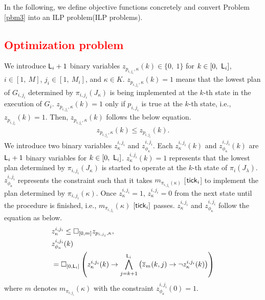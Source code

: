 \documentclass[journal,twoside,web]{IEEEtran}
\newcommand{\tick}{{\sf tick}}
\newcommand{\Len}{{\sf L}}
\newcommand{\G}[1]{\Box_{[#1]}}
\newcommand{\red}[1]{\textcolor{red}{#1}}
\begin{document}
In the following, we define objective functions concretely and convert Problem \ref{pbm3} into an ILP problem(ILP problems).
\red{
\subsection{Optimization problem}}
%
%
We introduce $\Len_i + 1$ binary variables $z_{p_{i,{j_i}},\kappa}(k)\in\{0,~1\}$ for $k\in[0,~\Len_i]$, $i\in[1,~M]$, $j_i\in[1,~M_i]$, and $\kappa\in K$.
$z_{p_{i,{j_i}},\kappa}(k)=1$ means that the lowest plan of $G_{i,{j_i}}$ determined by $\pi_{i,j_i}(J_\kappa)$ is being  implemented at the $k$-th state in the execution of $G_i$.
$z_{p_{i,{j_i}},\kappa}(k)=1$ only if $p_{i,{j_i}}$ is true at the $k$-th state, i.e., $z_{p_{i,{j_i}}}(k)=1$.
Then, $z_{p_{i,{j_i}},\kappa}(k)$ follows the below equation.
\begin{align}\label{hier1}
{z}_{p_{i,{j_i}},\kappa}(k) \leq z_{p_{i,{j_i}}}(k).
\end{align}
%
We introduce two binary variables ${z}^{i,j_i}_\kappa$ and $z^{i,j_i}_{\phi_\kappa}$.
Each ${z}^{i,{j_i}}_\kappa(k)$ and $z^{i,{j_i}}_{\phi_\kappa}(k)$ are $\Len_i + 1$ binary variables for $k\in[0,~\Len_i]$.
${z}^{i,j_i}_\kappa(k)=1$ represents that the lowest plan determined by $\pi_{i,j_i}(J_\kappa)$ is started to operate at the $k$-th state of $\pi_i(J_\lambda)$.
$z^{i,j_i}_{\phi_\kappa}$ represents the constraint such that it takes $m_{\pi_{i,{j_i}}(\kappa)}$ [$\tick_i$] to implement the plan determined by $\pi_{i,{j_i}}(\kappa)$.
Once ${z}^{i,j_i}_\kappa=1$, ${z}^{i,j_i}_\kappa=0$ from the next state until the procedure is finished, i.e., $m_{\pi_{i,j_i}}(\kappa)$ $[\tick_i]$ passes.
%
${z}^{i,j_i}_\kappa$ and $z^{i,j_i}_{\phi_\kappa}$ follow the equation as below.
%
\begin{align}
&{z}^{i,j_i}_\kappa
\leq\G{0,m} z_{p_{i,j_i},\kappa},\label{hier2-1}\\
&z^{i,j_i}_{\phi_\kappa} (k)
\notag \\
&=\G{0,\Len_i}
\left(
{z}_\kappa^{i,j_i} (k)\to
\bigwedge_{j=k+1}^{\Len_i}
\left(
\overline{z}_{m}
(k,j)\to \lnot {z}^{i,j_i}_\kappa (k)
\right)
\right)\label{hier2-2}
\end{align}
where $m$ denotes $m_{\pi_{i,j_i}}(\kappa)$ with the constraint $z^{i,{j_i}}_{\phi_\kappa}(0)=1 $.
\end{document}
